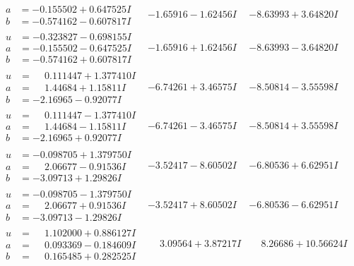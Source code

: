 \documentclass[1p]{elsarticle_modified}
\theoremstyle{definition}
\begin{document}
$$\begin{array}{c|c|c}
\begin{aligned}
a &= -0.155502 + 0.647525 I \\
b &= -0.574162 - 0.607817 I\end{aligned}
 & -1.65916 - 1.62456 I & -8.63993 + 3.64820 I \\ \hline\begin{aligned}
u &= -0.323827 - 0.698155 I \\
a &= -0.155502 - 0.647525 I \\
b &= -0.574162 + 0.607817 I\end{aligned}
 & -1.65916 + 1.62456 I & -8.63993 - 3.64820 I \\ \hline\begin{aligned}
u &= \phantom{-}0.111447 + 1.377410 I \\
a &= \phantom{-}1.44684 + 1.15811 I \\
b &= -2.16965 - 0.92077 I\end{aligned}
 & -6.74261 + 3.46575 I & -8.50814 - 3.55598 I \\ \hline\begin{aligned}
u &= \phantom{-}0.111447 - 1.377410 I \\
a &= \phantom{-}1.44684 - 1.15811 I \\
b &= -2.16965 + 0.92077 I\end{aligned}
 & -6.74261 - 3.46575 I & -8.50814 + 3.55598 I \\ \hline\begin{aligned}
u &= -0.098705 + 1.379750 I \\
a &= \phantom{-}2.06677 - 0.91536 I \\
b &= -3.09713 + 1.29826 I\end{aligned}
 & -3.52417 - 8.60502 I & -6.80536 + 6.62951 I \\ \hline\begin{aligned}
u &= -0.098705 - 1.379750 I \\
a &= \phantom{-}2.06677 + 0.91536 I \\
b &= -3.09713 - 1.29826 I\end{aligned}
 & -3.52417 + 8.60502 I & -6.80536 - 6.62951 I \\ \hline\begin{aligned}
u &= \phantom{-}1.102000 + 0.886127 I \\
a &= \phantom{-}0.093369 - 0.184609 I \\
b &= \phantom{-}0.165485 + 0.282525 I\end{aligned}
 & \phantom{-}3.09564 + 3.87217 I & \phantom{-}8.26686 + 10.56624 I \\ \hline\begin{aligned}

\end{aligned}
\end{array}$$
\end{document}
